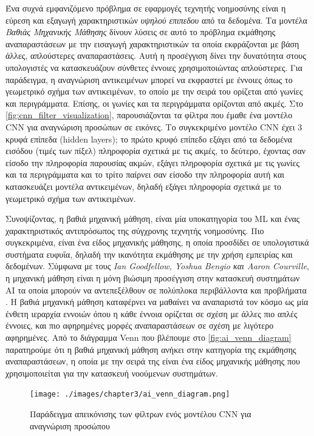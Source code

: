 Ένα συχνά εμφανιζόμενο πρόβλημα σε εφαρμογές τεχνητής νοημοσύνης είναι
η εύρεση και εξαγωγή χαρακτηριστικών \emph{υψηλού επιπεδου} από τα
δεδομένα. Τα μοντέλα \emph{Βαθιάς Μηχανικής Μάθησης} δίνουν λύσεις
σε αυτό το πρόβλημα εκμάθησης αναπαραστάσεων με την εισαγωγή χαρακτηριστικών
τα οποία εκφράζονται με βάση άλλες, απλούστερες αναπαραστάσεις. Αυτή η
προσέγγιση δίνει την δυνατότητα στους υπολογιστές να κατασκευάζουν σύνθετες
έννοιες χρησιμοποιώντας απλούστερες. Για παράδειγμα, η αναγνώριση αντικειμένων
μπορεί να εκφραστεί με έννοιες όπως το γεωμετρικό σχήμα των αντικειμένων,
το οποίο με την σειρά του ορίζεται από γωνίες και περιγράμματα. Επίσης,
οι γωνίες και τα περιγράμματα ορίζονται από ακμές. Στο \autoref{fig:cnn_filter_visualization},
παρουσιάζονται τα φίλτρα που έμαθε ένα μοντέλο CNN για αναγνώριση προσώπων σε εικόνες.
Το συγκεκριμένο μοντέλο CNN έχει 3 κρυφά επίπεδα (hidden layers); το πρώτο κρυφό
επίπεδο εξάγει από τα δεδομένα εισόδου (τιμές των πίξελ) πληροφορία σχετικά με
τις ακμές, το δεύτερο, έχοντας σαν είσοδο την πληροφορία παρουσίας ακμών, εξάγει πληροφορία
σχετικά με τις γωνίες και τα περιγράμματα και το τρίτο παίρνει σαν είσοδο
την πληροφορία αυτή και κατασκευάζει μοντέλα αντικειμένων, δηλαδή εξάγει πληροφορία
σχετικά με το γεωμετρικό σχήμα των αντικειμένων.

Συνοψίζοντας, η βαθιά μηχανική μάθηση, είναι μία υποκατηγορία του ML και ένας
χαρακτηριστικός αντιπρόσωπος της σύγχρονης
τεχνητής νοημοσύνης. Πιο συγκεκριμένα, είναι ένα είδος μηχανικής μάθησης, η
οποία προσδίδει σε υπολογιστικά συστήματα ευφυΐα, δηλαδή την ικανότητα
εκμάθησης με την χρήση εμπειρίας και δεδομένων. Σύμφωνα με τους
\emph{Ian Goodfellow, Yoshua Bengio και Aaron Courville}, η μηχανική μάθηση είναι η
μόνη βιώσιμη προσέγγιση στην κατασκευή συστημάτων AI τα οποία μπορούν να
αντεπεξέλθουν σε πολύπλοκα περιβάλλοντα και προβλήματα \cite{Goodfellow-et-al-2016-Book}.
Η βαθιά μηχανική μάθηση καταφέρνει να μαθαίνει να αναπαριστά τον κόσμο ως μία ένθετη
ιεραρχία εννοιών όπου η κάθε έννοια ορίζεται σε σχέση με άλλες πιο απλές έννοιες,
και πιο αφηρημένες μορφές αναπαραστάσεων σε σχέση με λιγότερο αφηρημένες.
Από το διάγραμμα Venn που βλέπουμε στο \autoref{fig:ai_venn_diagram} παρατηρούμε
ότι η βαθιά μηχανική μάθηση ανήκει στην κατηγορία της εκμάθησης αναπαραστάσεων,
η οποία με την σειρά της είναι ένα είδος μηχανικής μάθησης που χρησιμοποιείται
για την κατασκευή νοούμενων συστημάτων.

\begin{figure}[!ht]
  \centering
  \texttt{[image: ./images/chapter3/ai\_venn\_diagram.png]}
  \caption[Παράδειγμα απεικόνισης των φίλτρων ενός μοντέλου CNN για αναγνώριση προσώπου]{Παράδειγμα απεικόνισης των φίλτρων ενός μοντέλου CNN για αναγνώριση προσώπου}
  \label{fig:ai_venn_diagram}
\end{figure}
